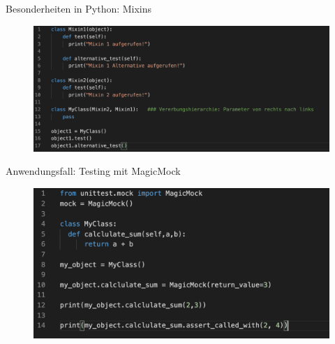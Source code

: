  
\begin{frame}{Besonderheiten in Python: Mixins}
   \begin{figure}[!htb]
        \includegraphics[scale=0.37]{6-python3/img/mixins}  %
    \end{figure}
   
  \end{frame}
       

\begin{frame}{Anwendungsfall: Testing mit MagicMock}
   \begin{figure}[!htb]
        \includegraphics[scale=0.47]{6-python3/img/magicmock}  
    \end{figure}
   
\end{frame}

